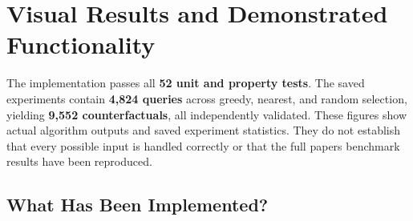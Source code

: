 \documentclass[14pt,a4paper,landscape]{extarticle}
\begin{document}
\color{ink}
\section{Visual Results and Demonstrated Functionality}
\label{visual-results-and-demonstrated-functionality}

The implementation passes all \textbf{52 unit and property tests}. The
saved experiments contain \textbf{4,824 queries} across greedy, nearest,
and random selection, yielding \textbf{9,552 counterfactuals}, all
independently validated. These figures show actual algorithm outputs and
saved experiment statistics. They do not establish that every possible
input is handled correctly or that the full paper\textquotesingle s
benchmark results have been reproduced.

\subsection{What Has Been Implemented?}
\label{what-has-been-implemented}
\end{document}

